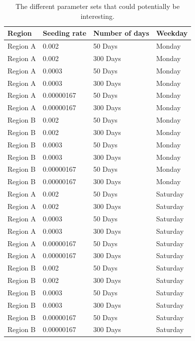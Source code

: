 \documentclass[runningheads]{llncs}
\begin{document}
\begin{table}[H]
	\centering
	\begin{tabular}{|l|l|l|l|}
	\hline
	\textbf{Region} & \textbf{Seeding rate} & \textbf{Number of days} & \textbf{Weekday} \\
	\hline
	Region A & 0.002 &      50 Days & Monday \\ 
	 \hline
	Region A & 0.002 &      300 Days & Monday \\ 
	 \hline
	Region A & 0.0003 &     50 Days &  Monday \\ 
	 \hline
	Region A & 0.0003 &     300 Days & Monday \\ 
	 \hline
	Region A & 0.00000167 & 50 Days &  Monday \\ 
	 \hline
	Region A & 0.00000167 & 300 Days & Monday \\ 
	 \hline
	Region B & 0.002 &      50 Days &  Monday \\ 
	 \hline
	Region B & 0.002 &      300 Days & Monday \\ 
	 \hline
	Region B & 0.0003 &     50 Days &  Monday \\ 
	 \hline
	Region B & 0.0003 &     300 Days & Monday \\ 
	 \hline
	Region B & 0.00000167 & 50 Days &  Monday \\ 
	 \hline
	Region B & 0.00000167 & 300 Days & Monday \\ 
	 \hline
	Region A & 0.002 &      50 Days & Saturday \\ 
	 \hline
	Region A & 0.002 &      300 Days & Saturday \\ 
	 \hline
	Region A & 0.0003 &     50 Days &  Saturday \\ 
	 \hline
	Region A & 0.0003 &     300 Days & Saturday \\ 
	 \hline
	Region A & 0.00000167 & 50 Days &  Saturday \\ 
	 \hline
	Region A & 0.00000167 & 300 Days & Saturday \\ 
	 \hline
	Region B & 0.002 &      50 Days &  Saturday \\ 
	 \hline
	Region B & 0.002 &      300 Days & Saturday \\ 
	 \hline
	Region B & 0.0003 &     50 Days &  Saturday \\ 
	 \hline
	Region B & 0.0003 &     300 Days & Saturday \\ 
	 \hline
	Region B & 0.00000167 & 50 Days &  Saturday \\ 
	 \hline
	Region B & 0.00000167 & 300 Days & Saturday \\ 
	 \hline
	\end{tabular}
	\caption{The different parameter sets that could potentially be interesting.}
	\label{2_1_regionDiff_tableParamSets_full}
\end{table}
\end{document}
